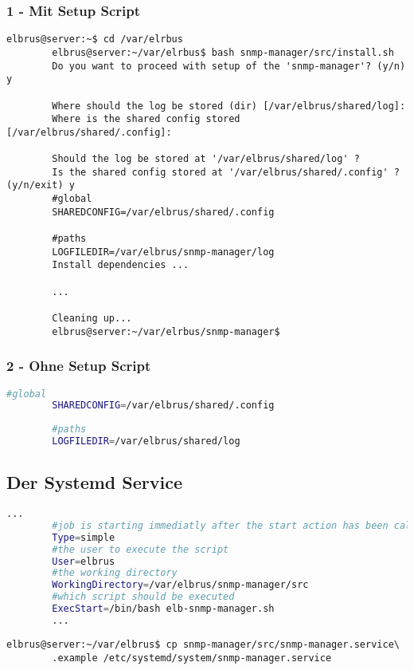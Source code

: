 \documentclass{article}
\begin{document}
	\subsubsection{1 - Mit Setup Script}
	\lstset{style=commands}
	\begin{lstlisting}[caption={Ausführen des 'install.sh' Scripts.}]
		elbrus@server:~$ cd /var/elrbus
		elbrus@server:~/var/elrbus$ bash snmp-manager/src/install.sh
		Do you want to proceed with setup of the 'snmp-manager'? (y/n) y
		
		Where should the log be stored (dir) [/var/elbrus/shared/log]:
		Where is the shared config stored [/var/elbrus/shared/.config]:
		
		Should the log be stored at '/var/elbrus/shared/log' ?
		Is the shared config stored at '/var/elbrus/shared/.config' ? (y/n/exit) y
		#global
		SHAREDCONFIG=/var/elbrus/shared/.config
		
		#paths
		LOGFILEDIR=/var/elbrus/snmp-manager/log
		Install dependencies ...
		
		...
		
		Cleaning up...
		elbrus@server:~/var/elrbus/snmp-manager$
	\end{lstlisting}
	
	\subsubsection{2 - Ohne Setup Script}
	\lstset{style=files}
	\begin{lstlisting}[caption={Anhand von '.env.example' eigene '.env' Datei anlegen.}, language=bash, keywords={CONFIGPATH, MAINPATH}, keywordstyle=\color{red}, firstnumber=17]
		#global
		SHAREDCONFIG=/var/elbrus/shared/.config
		
		#paths
		LOGFILEDIR=/var/elbrus/shared/log
	\end{lstlisting}
	
	\newpage
	\subsection[systemd service]{Der Systemd Service}
	\lstset{style=files}
	\begin{lstlisting}[caption={snmp-manager.service.example - Die Variable 'WorkingDirectory' sowie die Variable 'User' anpassen.},language=bash ,keywords={WorkingDirectory, User}, keywordstyle=\color{red}, firstnumber=5]
		...
		#job is starting immediatly after the start action has been called
		Type=simple
		#the user to execute the script
		User=elbrus
		#the working directory
		WorkingDirectory=/var/elbrus/snmp-manager/src
		#which script should be executed
		ExecStart=/bin/bash elb-snmp-manager.sh
		...
	\end{lstlisting}
	\lstset{style=commands}
	\begin{lstlisting}[caption={Kopieren des Serviceprogrammes.}]
		elbrus@server:~/var/elbrus$ cp snmp-manager/src/snmp-manager.service\
		.example /etc/systemd/system/snmp-manager.service
	\end{lstlisting}
	
\end{document}
